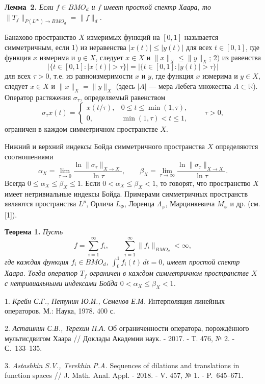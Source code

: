 \textbf{Лемма~2.} {\it Если $f\in BMO_d$ и $f$ имеет простой спектр Хаара, то $\|T_f\|_{P(L^{\infty})\to BMO_d}=\|f\|_d$.}

Банахово пространство $X$ измеримых функций на $[0,1]$ называется симметричным, если
1) из неравенства $|x(t)|\leqslant|y(t)|$ для всех $t\in[0,1]$,
где функция $x$ измерима и $y\in X$, следует $x\in X$ и $\|x\|_X\leqslant\|y\|_X$;
2) из равенства
$$
|\{t\in[0,1]:|x(t)|>\tau\}|=|\{t\in[0,1]:|y(t)|>\tau\}|
$$
для всех $\tau>0$, т.е. из равноизмеримости $x$ и $y$, где функция $x$ измерима и $y\in X$,
следует $x\in X$ и $\|x\|_X=\|y\|_X$ (здесь
\linebreak
$|A|$ --- мера Лебега множества $A\subset\mathbb{R}$).
Оператор растяжения $\sigma_{\tau}$, определяемый равенством
$$
\sigma_{\tau}x(t)=\begin{cases}
x(t/\tau), & 0\leqslant t\leqslant\min(1,\tau),\\
0, & \min(1,\tau)<t\leqslant1,
\end{cases}
\qquad \tau>0,
$$
ограничен в каждом симметричном пространстве $X$.

Нижний и верхний индексы Бойда симметричного пространства $X$ определяются соотношениями
$$
\alpha_X=\lim_{\tau\to0}\frac{\ln\|\sigma_{\tau}\|_{X\to X}}{\ln\tau}, \qquad
\beta_X=\lim_{\tau\to\infty}\frac{\ln\|\sigma_{\tau}\|_{X\to X}}{\ln\tau}.
$$
Всегда $0\leqslant\alpha_X\leqslant\beta_X\leqslant1$. Если $0<\alpha_X\leqslant\beta_X<1$, то говорят, что пространство $X$ имеет нетривиальные индексы Бойда.
Примерами симметричных пространств являются пространства $L^p$, Орлича $L_{\varPhi}$, Лоренца $\varLambda_{\varphi}$, Марцинкевича $M_{\varphi}$ и др. (см. [1]).

\textbf{Теорема 1.} {\it Пусть
$$
f=\sum_{i=1}^{\infty}f_i, \qquad \sum_{i=1}^{\infty}\|f_i\|_{BMO_d}<\infty,
$$
где каждая функция $f_i\in BMO_d$, $\int_0^1f_i(t)\,dt=0$, имеет простой спектр Хаара. Тогда оператор $T_f$ ограничен в каждом симметричном пространстве $X$ с нетривиальными индексами Бойда $0<\alpha_X\leqslant\beta_X<1$.}


\litlist

1. {\it Крейн С.Г., Петунин Ю.И., Семенов Е.М.} Интерполяция линейных операторов. М.: Наука, 1978. 400 с.

2. {\it Асташкин С.В., Терехин П.А.} Об ограниченности оператора, порождённого мультисдвигом Хаара // Доклады Академии наук. - 2017. -
Т. 476, № 2. - С.~133--135.

3. {\it Astashkin S.V., Terekhin P.A.} Sequences of dilations and translations in function spaces // J. Math. Anal. Appl. - 2018. -
V. 457, № 1. - P.~645--671.
